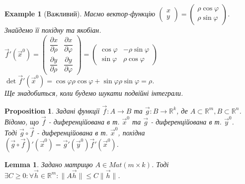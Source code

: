 \documentclass[a4paper, 10pt]{article}
\def\departial#1#2{\dfrac{\partial {#1}}{\partial {#2}}}
\theoremstyle{theoremdd}
\theoremstyle{theoremdd}
\theoremstyle{theoremdd}
\theoremstyle{theoremdd}
\theoremstyle{theoremdd}
\newtheorem{example}[theorem]{Example}
\theoremstyle{theoremdd}
\newtheorem{proposition}[theorem]{Proposition}
\theoremstyle{theoremdd}
\theoremstyle{theoremdd}
\newtheorem{lemma}[theorem]{Lemma}
\theoremstyle{theoremdd}
\newcommand\Norm[1]{\lVert#1\rVert}
\begin{document}
\begin{example}[Важливий]
Маємо вектор-функцію $\begin{pmatrix}
x \\ y
\end{pmatrix} = \begin{pmatrix}
\rho \cos \varphi \\
\rho \sin \varphi
\end{pmatrix}$. Знайдемо її похідну та якобіан.\\
$\vec{f}'(\vec{x}^0) = \begin{pmatrix}
\departial{x}{\rho} & \departial{x}{\varphi} \\
\departial{y}{\rho} & \departial{y}{\varphi}
\end{pmatrix} = \begin{pmatrix}
\cos \varphi & -\rho \sin \varphi \\
\sin \varphi & \rho \cos \varphi
\end{pmatrix}$ \hspace{1cm} $\det \vec{f}'(\vec{x}^0) = \cos \varphi \rho \cos \varphi + \sin \varphi \rho \sin \varphi = \rho$.\\
Ще знадобиться, коли будемо шукати подвійні інтеграли.
\end{example}

\begin{proposition}
Задані функції $\vec{f}: A \to B$ та $\vec{g}: B \to \mathbb{R}^k$, де $A \subset \mathbb{R}^m, B \subset \mathbb{R}^n$.\\
Відомо, що $\vec{f}$ - диференційована в т. $\vec{x}^0$ та $\vec{g}$ - диференційована в т. $\vec{y}^0$. \\ Тоді $\vec{g} \circ \vec{f}$ - диференційована в т. $\vec{x}^0$, похідна $(\vec{g} \circ \vec{f})'(\vec{x}^0) = \vec{g}'(\vec{y}^0) \vec{f}'(\vec{x}^0)$.
\end{proposition}

\begin{lemma}
Задано матрицю $A \in Mat(m \times k)$. Тоді $\exists C \geq 0: \forall \vec{h} \in \mathbb{R}^m: \Norm{A \vec{h}} \leq C \Norm{\vec{h}}$.
\end{lemma}
\end{document}
